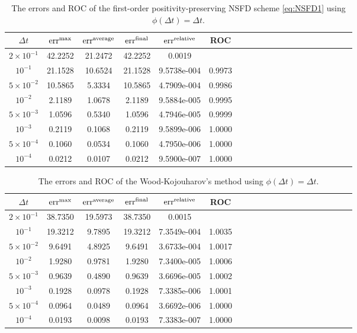 \documentclass[11pt]{article}
\theoremstyle{definition}
\theoremstyle{remark}
\numberwithin{equation}{section}
\DeclareMathOperator{\err}{err}
\begin{document}
\begin{table}[htb]
\centering
\caption{The errors and ROC of the first-order positivity-preserving NSFD scheme \eqref{eq:NSFD1} using $\phi(\Delta t) = \Delta t$.}\label{Table2}
\begin{tabular}{cccccccccccccccccccc}
\hline
$\Delta t$ & $\err^{\rm max}$ & $\err^{\rm average}$ & $\err^{\rm final}$ & $\err^{\rm relative}$ & ROC \\
\hline
$2 \times 10^{-1}$ &  42.2252 & 21.2472 & 42.2252 &  0.0019 &\\
$10^{-1}$ & 21.1528 & 10.6524 &  21.1528 & 9.5738e-004 & 0.9973\\
$5 \times 10^{-2}$ &  10.5865 &  5.3334 & 10.5865 & 4.7909e-004 & 0.9986\\
$10^{-2}$ &  2.1189 &  1.0678 &  2.1189 & 9.5884e-005 &  0.9995\\
$5 \times 10^{-3}$ &  1.0596 & 0.5340 & 1.0596 & 4.7946e-005 &  0.9999\\
$10^{-3}$ & 0.2119 & 0.1068 &  0.2119 & 9.5899e-006 &  1.0000\\
$5 \times 10^{-4}$ &  0.1060 & 0.0534 & 0.1060 & 4.7950e-006 & 1.0000\\
$10^{-4}$ & 0.0212 & 0.0107 & 0.0212 & 9.5900e-007 &  1.0000\\
\hline
\end{tabular}
\end{table}

\begin{table}[htb]
\centering
\caption{The errors and ROC of the Wood-Kojouharov's method \cite{Wood1} using $\phi(\Delta t) = \Delta t$.}\label{Table3}
\begin{tabular}{cccccccccccccccccccc}
\hline
$\Delta t$ & $\err^{\rm max}$ & $\err^{\rm average}$ & $\err^{\rm final}$ & $\err^{\rm relative}$ & ROC \\
\hline
$2 \times 10^{-1}$ &  38.7350 & 19.5973 & 38.7350 &  0.0015 &\\
$10^{-1}$ & 19.3212 & 9.7895 & 19.3212 & 7.3549e-004 &  1.0035 \\
$5 \times 10^{-2}$ &  9.6491 &  4.8925 & 9.6491 & 3.6733e-004 & 1.0017\\
$10^{-2}$ &  1.9280 & 0.9781 &  1.9280 & 7.3400e-005 & 1.0006\\
$5 \times 10^{-3}$ &  0.9639 & 0.4890 & 0.9639 & 3.6696e-005 & 1.0002\\
$10^{-3}$ & 0.1928 & 0.0978 &  0.1928 &  7.3385e-006 & 1.0001 \\
$5 \times 10^{-4}$ &  0.0964 & 0.0489 &  0.0964 & 3.6692e-006 & 1.0000\\
$10^{-4}$ &  0.0193 &   0.0098 & 0.0193 & 7.3383e-007 &  1.0000\\
\hline
\end{tabular}
\end{table}
\end{document}
